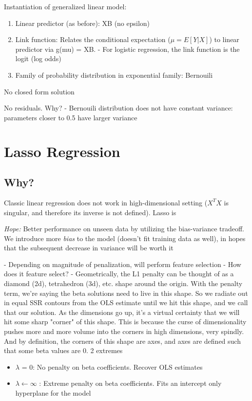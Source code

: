 \documentclass{article}
\begin{document}
Instantiation of generalized linear model:
\begin{enumerate}
	\item Linear predictor (as before): XB (no epsilon)
	\item Link function: Relates the conditional expectation ($\mu = E[Y|X]$) to linear predictor via g(mu) = XB.
		- For logistic regression, the link function is the logit (log odds)
	\item Family of probability distribution in exponential family: Bernouili
\end{enumerate}

No closed form solution

No residuals. Why?
	- Bernouili  distribution does not have constant variance: parameters closer to 0.5 have larger variance

\section{Lasso Regression}

\subsection{Why?}

Classic linear regression does not work in high-dimensional setting ($X^T X$ is singular, and therefore its inverse is not defined). Lasso is
	
\textit{Hope:} Better performance on unseen data by utilizing the bias-variance tradeoff. We introduce more \textit{bias} to the model (doesn't fit training data as well), in hopes that the subsequent decrease in variance will be worth it

	- Depending on magnitude of penalization, will perform feature selection
- How does it feature select?
	- Geometrically, the L1 penalty can be thought of as a diamond (2d), tetrahedron (3d), etc. shape around the origin. With the penalty term, we're saying the beta solutions need to live in this shape. So we radiate out in equal SSR contours from the OLS estimate until we hit this shape, and we call that our solution. As the dimensions go up, it's a virtual certainty that we will hit some sharp "corner" of this shape. This is because the curse of dimensionality pushes more and more volume into the corners in high dimensions, very spindly. And by definition, the corners of this shape are axes, and axes are defined such that some beta values are 0.
2 extremes
\begin{itemize}
	\item $\lambda$ = 0: No penalty on beta coefficients. Recover OLS estimates
	\item $\lambda \leftarrow \infty$ : Extreme penalty on beta coefficients. Fits an intercept only hyperplane for the model
\end{itemize}
\end{document}
